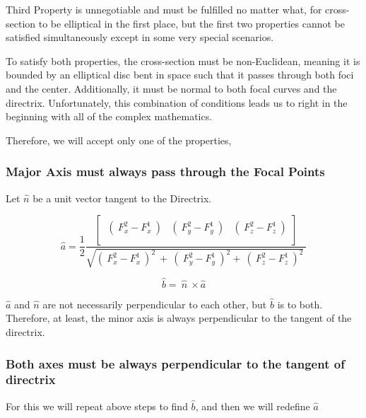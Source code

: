 \documentclass[a4paper]{article}
\begin{document}
Third Property is unnegotiable and must be fulfilled no matter what, for cross-section to be elliptical in the first place, but the first two properties cannot be satisfied simultaneously except in some very special scenarios.

To satisfy both properties, the cross-section must be non-Euclidean, meaning it is bounded by an elliptical disc bent in space such that it passes through both foci and the center. Additionally, it must be normal to both focal curves and the directrix. Unfortunately, this combination of conditions leads us to right in the beginning with all of the complex mathematics.

Therefore, we will accept only one of the properties,

\hypertarget{major-axis-must-always-pass-through-the-focal-points}{%
\subsubsection{Major Axis must always pass through the Focal
Points}\label{major-axis-must-always-pass-through-the-focal-points}}

Let \(\hat{n}\) be a unit vector tangent to the Directrix.

\[\hat{a} = \frac{1}{2}\frac{\begin{bmatrix}
\ \left( \ F_{x}^{2} - F_{x}^{1}\  \right) & \left( \ F_{y}^{2} - F_{y}^{1}\  \right) & \left( \ F_{z}^{2} - F_{z}^{1}\  \right) \\
\end{bmatrix}}{\sqrt{\left( \ F_{x}^{2} - F_{x}^{1}\  \right)^{2}\  + \ \left( \ F_{y}^{2} - F_{y}^{1}\  \right)^{2} + \ \left( \ F_{z}^{2} - F_{z}^{1}\  \right)^{2}}\ }\]

\[\hat{b} = \ \hat{n}\  \times \hat{a}\]

\(\hat{a}\) and \(\hat{n}\) are not necessarily perpendicular to each other, but \(\hat{b}\) is to both. Therefore, at least, the minor axis is always perpendicular to the tangent of the directrix.

\hypertarget{both-axes-must-be-always-perpendicular-to-tangent-of-directrix}{%
\subsubsection{Both axes must be always perpendicular to the tangent of
directrix}\label{both-axes-must-be-always-perpendicular-to-tangent-of-directrix}}

For this we will repeat above steps to find \(\hat{b}\), and then we
will redefine \(\hat{a}\)
\end{document}
